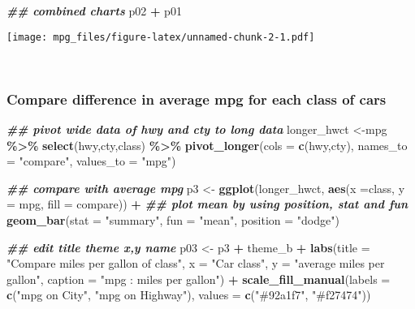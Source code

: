 \documentclass[
]{article}
\newenvironment{Shaded}{\begin{snugshade}}{\end{snugshade}}
\newcommand{\AttributeTok}[1]{\textcolor[rgb]{0.13,0.29,0.53}{#1}}
\newcommand{\DocumentationTok}[1]{\textcolor[rgb]{0.56,0.35,0.01}{\textbf{\textit{#1}}}}
\newcommand{\FunctionTok}[1]{\textcolor[rgb]{0.13,0.29,0.53}{\textbf{#1}}}
\newcommand{\NormalTok}[1]{#1}
\newcommand{\OtherTok}[1]{\textcolor[rgb]{0.56,0.35,0.01}{#1}}
\newcommand{\SpecialCharTok}[1]{\textcolor[rgb]{0.81,0.36,0.00}{\textbf{#1}}}
\newcommand{\StringTok}[1]{\textcolor[rgb]{0.31,0.60,0.02}{#1}}
\begin{document}
\begin{Shaded}
\begin{Highlighting}[]
\DocumentationTok{\#\# combined charts}
\NormalTok{p02 }\SpecialCharTok{+}\NormalTok{ p01}
\end{Highlighting}
\end{Shaded}

\texttt{[image: mpg\_files/figure-latex/unnamed-chunk-2-1.pdf]}\\
\strut \\

\hypertarget{compare-difference-in-average-mpg-for-each-class-of-cars}{%
\subsubsection{\texorpdfstring{\textbf{Compare difference in average mpg
for each class of
cars}}{Compare difference in average mpg for each class of cars}}\label{compare-difference-in-average-mpg-for-each-class-of-cars}}

\begin{Shaded}
\begin{Highlighting}[]
\DocumentationTok{\#\# pivot wide data of hwy and cty to long data}
\NormalTok{longer\_hwct }\OtherTok{\textless{}{-}}\NormalTok{mpg }\SpecialCharTok{\%\textgreater{}\%}
  \FunctionTok{select}\NormalTok{(hwy,cty,class) }\SpecialCharTok{\%\textgreater{}\%}
  \FunctionTok{pivot\_longer}\NormalTok{(}\AttributeTok{cols =} \FunctionTok{c}\NormalTok{(hwy,cty), }\AttributeTok{names\_to =} \StringTok{"compare"}\NormalTok{, }\AttributeTok{values\_to =} \StringTok{"mpg"}\NormalTok{) }

\DocumentationTok{\#\# compare with average mpg}
\NormalTok{p3 }\OtherTok{\textless{}{-}} \FunctionTok{ggplot}\NormalTok{(longer\_hwct, }\FunctionTok{aes}\NormalTok{(}\AttributeTok{x =}\NormalTok{class, }\AttributeTok{y =}\NormalTok{ mpg, }\AttributeTok{fill =}\NormalTok{ compare)) }\SpecialCharTok{+} 
  \DocumentationTok{\#\# plot mean by using position, stat and fun}
  \FunctionTok{geom\_bar}\NormalTok{(}\AttributeTok{stat =} \StringTok{"summary"}\NormalTok{, }\AttributeTok{fun =} \StringTok{"mean"}\NormalTok{, }\AttributeTok{position =} \StringTok{"dodge"}\NormalTok{)}

\DocumentationTok{\#\# edit title theme x,y name}
\NormalTok{p03 }\OtherTok{\textless{}{-}}
\NormalTok{p3 }\SpecialCharTok{+}\NormalTok{ theme\_b }\SpecialCharTok{+}
  \FunctionTok{labs}\NormalTok{(}\AttributeTok{title =} \StringTok{"Compare miles per gallon of class"}\NormalTok{,}
       \AttributeTok{x =} \StringTok{"Car class"}\NormalTok{,}
       \AttributeTok{y =} \StringTok{"average miles per gallon"}\NormalTok{,}
       \AttributeTok{caption =} \StringTok{"mpg : miles per gallon"}\NormalTok{) }\SpecialCharTok{+}
  \FunctionTok{scale\_fill\_manual}\NormalTok{(}\AttributeTok{labels =} \FunctionTok{c}\NormalTok{(}\StringTok{"mpg on City"}\NormalTok{, }\StringTok{"mpg on Highway"}\NormalTok{), }\AttributeTok{values =} \FunctionTok{c}\NormalTok{(}\StringTok{"\#92a1f7"}\NormalTok{, }\StringTok{"\#f27474"}\NormalTok{))}
\end{Highlighting}
\end{Shaded}
\end{document}
